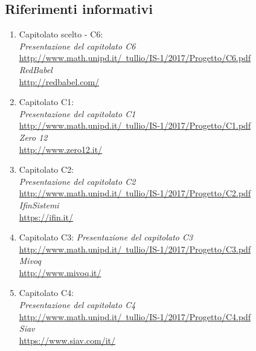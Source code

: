 \documentclass[main.tex]{subfiles}
\begin{document}
\subsection{Riferimenti informativi}
\begin{enumerate}
	\item Capitolato scelto - C6:\\
		\textit{Presentazione del capitolato C6}\\
		\href{http://www.math.unipd.it/~tullio/IS-1/2017/Progetto/C6.pdf}{http://www.math.unipd.it/~tullio/IS-1/2017/Progetto/C6.pdf}\\
		\textit{RedBabel}\\
		\href{http://redbabel.com/}{http://redbabel.com/}\\
		
	\item Capitolato C1:\\
		\textit{Presentazione del capitolato C1}\\
		\href{http://www.math.unipd.it/~tullio/IS-1/2017/Progetto/C1.pdf}{http://www.math.unipd.it/~tullio/IS-1/2017/Progetto/C1.pdf}\\
		\textit{Zero 12}\\
		\href{http://www.zero12.it/}{http://www.zero12.it/}\\
		
	\item Capitolato C2:\\
		\textit{Presentazione del capitolato C2}\\
		\href{http://www.math.unipd.it/~tullio/IS-1/2017/Progetto/C2.pdf}{http://www.math.unipd.it/~tullio/IS-1/2017/Progetto/C2.pdf}\\
		\textit{IfinSistemi}\\
		\href{https://ifin.it/}{https://ifin.it/}\\
		
	\item Capitolato C3:
		\textit{Presentazione del capitolato C3}\\
		\href{http://www.math.unipd.it/~tullio/IS-1/2017/Progetto/C3.pdf}{http://www.math.unipd.it/~tullio/IS-1/2017/Progetto/C3.pdf}\\
		\textit{Mivoq}\\
		\href{http://www.mivoq.it/}{http://www.mivoq.it/}\\
		
	\item Capitolato C4:\\
		\textit{Presentazione del capitolato C4}\\
		\href{http://www.math.unipd.it/~tullio/IS-1/2017/Progetto/C4.pdf}{http://www.math.unipd.it/~tullio/IS-1/2017/Progetto/C4.pdf}\\
		\textit{Siav}\\
		\href{https://www.siav.com/it/}{https://www.siav.com/it/}\\
		

\end{enumerate}
\end{document}
